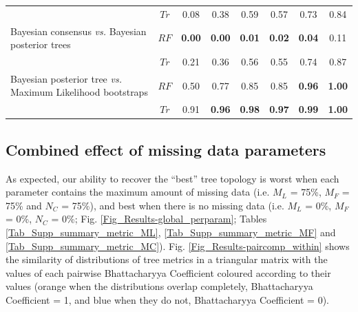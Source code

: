 \begin{landscape}
\begin{table}[!htb]
\begin{tabular}{lccccccc}
                                                                       & $Tr$ & 0.08 & 0.38 & 0.59 & 0.57 & 0.73 & 0.84 \\ 
    Bayesian consensus \textit{vs.} Bayesian posterior trees           & $RF$ & \textbf{0.00} & \textbf{0.00} & \textbf{0.01} & \textbf{0.02} & \textbf{0.04} & 0.11 \\ 
                                                                       & $Tr$ & 0.21 & 0.36 & 0.56 & 0.55 & 0.74 & 0.87 \\ 
    Bayesian posterior tree \textit{vs.} Maximum Likelihood bootstraps & $RF$ & 0.50 & 0.77 & 0.85 & 0.85 & \textbf{0.96} & \textbf{1.00} \\ 
                                                                       & $Tr$ & 0.91 & \textbf{0.96} & \textbf{0.98} & \textbf{0.97} & \textbf{0.99} & \textbf{1.00} \\ 
   \hline
\end{tabular}
\label{Tab_Results-Difference_methods}
\end{table}
\end{landscape}


\subsection{Combined effect of missing data parameters}
As expected, our ability to recover the ``best'' tree topology is worst when each parameter contains the maximum amount of missing data (i.e. $M_{L}$ = 75\%, $M_{F}$ = 75\% and $N_{C}$ = 75\%), and best when there is no missing data (i.e. $M_{L}$ = 0\%, $M_{F}$ = 0\%, $N_{C}$ = 0\%; Fig. \ref{Fig_Results-global_perparam}; Tables \ref{Tab_Supp_summary_metric_ML}, \ref{Tab_Supp_summary_metric_MF} and \ref{Tab_Supp_summary_metric_MC}).
Fig. \ref{Fig_Results-paircomp_within} shows the similarity of distributions of tree metrics in a triangular matrix with the values of each pairwise Bhattacharyya Coefficient coloured according to their values (orange when the distributions overlap completely, Bhattacharyya Coefficient = 1, and blue when they do not, Bhattacharyya Coefficient = 0). 

